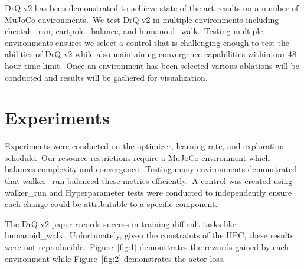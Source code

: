 \documentclass[conference]{./IEEEtran/IEEEtran} %
\begin{document}
    DrQ-v2 has been demonstrated to achieve state-of-the-art results on a number of MuJoCo environments.\ We test DrQ-v2 in multiple
    environments including cheetah\_run, cartpole\_balance, and humanoid\_walk.\ Testing multiple environments ensures we select a
    control that is challenging enough to test the abilities of DrQ-v2 while also maintaining convergence capabilities within
    our 48-hour time limit.\ Once an environment has been selected various ablations will be conducted and results will be
    gathered for visualization.\

    \section{Experiments}\label{sec:experiments}

    Experiments were conducted on the optimizer, learning rate, and exploration schedule.\ Our resource restrictions require a
    MuJoCo environment which balances complexity and convergence.\ Testing many environments demonstrated that walker\_run balanced
    these metrics efficiently.\ A control was created using walker\_run and Hyperparameter tests were conducted to independently
    ensure each change could be attributable to a specific component.\

    The DrQ-v2 paper records success in training difficult tasks like humanoid\_walk.\ Unfortunately, given the constraints of
    the HPC, these results were not reproducible.\ Figure~\ref{fig:1} demonstrates the rewards gained by each environment
    while Figure~\ref{fig:2} demonstrates the actor loss.
\end{document}
